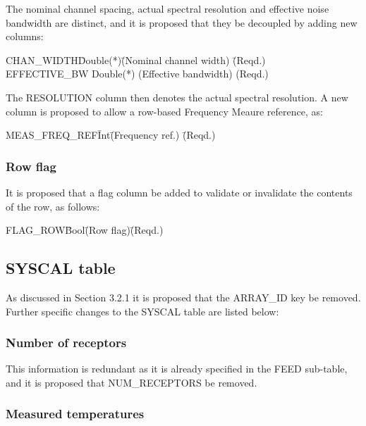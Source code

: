 \documentclass{article}
\begin{document}
The nominal channel spacing, actual spectral resolution and effective
noise bandwidth are distinct, and it is proposed that they be
decoupled by adding new columns:

\begin{tabbing}
CHAN\_WIDTH\quad\quad \= Double(*)\quad\quad \= 
(Nominal channel width) \quad\quad\quad\quad\quad \= (Reqd.) \\
EFFECTIVE\_BW \> Double(*) \> (Effective bandwidth) \> (Reqd.)\\
\end{tabbing}

The RESOLUTION column then denotes the actual spectral resolution.  A
new column is proposed to allow a row-based Frequency Meaure
reference, as:

\begin{tabbing}
MEAS\_FREQ\_REF\quad\quad \= Int\quad\quad \= (Frequency ref.)\quad\quad 
 \= (Reqd.) \\
\end{tabbing}

\subsubsection{Row flag}

It is proposed that a flag column be added to validate or invalidate
the contents of the row, as follows:

\begin{tabbing}
FLAG\_ROW\quad\quad \= Bool\quad\quad \= (Row flag)\quad\quad \= (Reqd.)\\
\end{tabbing}

\subsection{SYSCAL table}

As discussed in Section 3.2.1 it is proposed that the ARRAY\_ID key be
removed.  Further specific changes to the SYSCAL table are listed
below:

\subsubsection{Number of receptors}

This information is redundant as it is already specified in the FEED
sub-table, and it is proposed that NUM\_RECEPTORS be removed.

\subsubsection{Measured temperatures}
\end{document}
